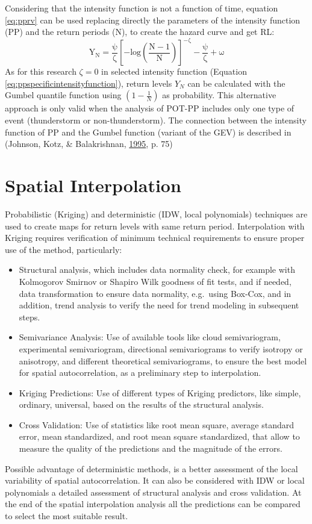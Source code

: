 \documentclass[12pt,twoside]{reedthesis}
\begin{document}
Considering that the intensity function is not a function of time, equation \eqref{eq:pprv} can be used replacing directly the parameters of the intensity function (PP) and the return periods (N), to create the hazard curve and get RL:
\begin{equation}
  \mathrm{
Y_N=\frac{\psi}{\zeta}\left[-log\left(\frac{N-1}{N}\right)\right]^{-\zeta}-\frac{\psi}{\zeta}+\omega
        }
  \label{eq:pprv}
\end{equation}
As for this research \(\zeta = 0\) in selected intensity function (Equation \eqref{eq:ppspecificintensityfunction}), return levels \(Y_N\) can be calculated with the Gumbel quantile function using \((1-\frac{1}{N})\) as probability. This alternative approach is only valid when the analysis of POT-PP includes only one type of event (thunderstorm or non-thunderstorm). The connection between the intensity function of PP and the Gumbel function (variant of the GEV) is described in (Johnson, Kotz, \& Balakrishnan, \protect\hyperlink{ref-Johnson1995}{1995}, p. 75)

\hypertarget{si}{%
\section{Spatial Interpolation}\label{si}}

Probabilistic (Kriging) and deterministic (IDW, local polynomials) techniques are used to create maps for return levels with same return period. Interpolation with Kriging requires verification of minimum technical requirements to ensure proper use of the method, particularly:
\begin{itemize}
\item
  Structural analysis, which includes data normality check, for example with Kolmogorov Smirnov or Shapiro Wilk goodness of fit tests, and if needed, data transformation to ensure data normality, e.g.~using Box-Cox, and in addition, trend analysis to verify the need for trend modeling in subsequent steps.
\item
  Semivariance Analysis: Use of available tools like cloud semivariogram, experimental semivariogram, directional semivariograms to verify isotropy or anisotropy, and different theoretical semivariograms, to ensure the best model for spatial autocorrelation, as a preliminary step to interpolation.
\item
  Kriging Predictions: Use of different types of Kriging predictors, like simple, ordinary, universal, based on the results of the structural analysis.
\item
  Cross Validation: Use of statistics like root mean square, average standard error, mean standardized, and root mean square standardized, that allow to measure the quality of the predictions and the magnitude of the errors.
\end{itemize}
Possible advantage of deterministic methods, is a better assessment of the local variability of spatial autocorrelation. It can also be considered with IDW or local polynomials a detailed assessment of structural analysis and cross validation. At the end of the spatial interpolation analysis all the predictions can be compared to select the most suitable result.
\end{document}
